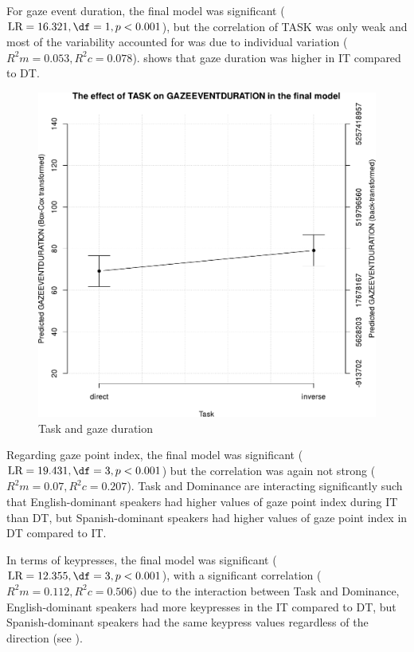 \documentclass[output=paper]{langscibook}
\begin{document}
For gaze event duration, the final model was significant ($\text{LR} = 16.321, \df = 1, p < 0.001$), but the correlation of TASK was only weak and most of the variability accounted for was due to individual variation ($R^2m = 0.053, R^2c = 0.078$).  shows that gaze duration was higher in IT compared to DT. 

\begin{figure}
        \includegraphics[height=.45\textheight]{figures/Ferreira-Figure1.3.pdf}
        \caption{Task and gaze duration\label{fig3h}}
\end{figure}

Regarding gaze point index, the final model was significant ($\text{LR} = 19.431, \df = 3, p < 0.001$) but the correlation was again not strong ($R^2m = 0.07, R^2c = 0.207$). Task and Dominance are interacting significantly such that English-dominant speakers had higher values of gaze point index during IT than DT, but Spanish-dominant speakers had higher values of gaze point index in DT compared to IT. 

In terms of keypresses, the final model was significant ($\text{LR} = 12.355, \df = 3, p < 0.001$), with a significant correlation ($R^2m = 0.112, R^2c = 0.506$) due to the interaction between Task and Dominance, English-dominant speakers had more keypresses in the IT compared to DT, but Spanish-dominant speakers had the same keypress values regardless of the direction (see ).
\end{document}
